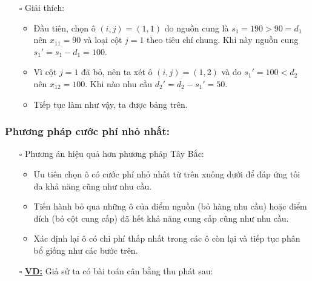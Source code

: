 \documentclass{article}
\begin{document}
\begin{itemize}
    \item [$\square$] Giải thích:
    \begin{itemize}[label=\textbullet]
        \item Đầu tiên, chọn ô $(i,j)=(1,1)$ do nguồn cung là $s_1=190 > 90= d_1$ nên $x_{11} = 90$ và loại cột $j = 1$ theo tiêu chí chung. Khi này nguồn cung $s_1' = s_1 - d_1 = 100$.
        \item Vì cột $j=1$ đã bỏ, nên ta xét ô $(i,j)=(1,2)$ và do $s_1' = 100 < d_2$ nên $x_{12} = 100$. Khi nào nhu cầu $d_2'=d_2-s_1'=50$.
        \item Tiếp tục làm như vậy, ta được bảng trên.
    \end{itemize}
\end{itemize}
\subsubsection{Phương pháp cước phí nhỏ nhất:}
\begin{itemize}
    \item [$\square$] Phương án hiệu quả hơn phương pháp Tây Bắc:
    \begin{itemize}[label=\textbullet]
        \item Ưu tiên chọn ô có cước phí nhỏ nhất từ trên xuống dưới để đáp ứng tối đa khả năng cũng như nhu cầu.
        \item Tiến hành bỏ qua những ô của điểm nguồn (bỏ hàng nhu cầu) hoặc điểm đích (bỏ cột cung cấp) đã hết khả năng cung cấp cũng như nhu cầu.
        \item Xác định lại ô có chi phí thấp nhất trong các ô còn lại và tiếp tục phân bổ giống như các bước trên.
    \end{itemize}
    \item [$\square$] \textbf{\underline{VD:}} Giả sử ta có bài toán cân bằng thu phát sau:
\end{itemize}
\end{document}
